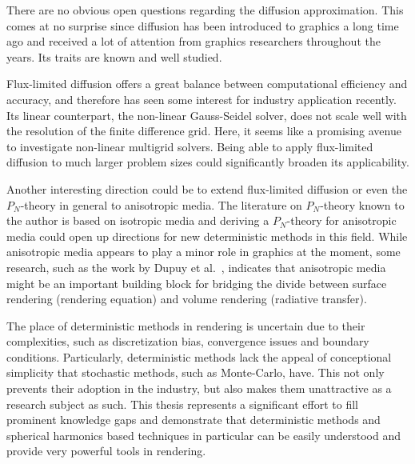 There are no obvious open questions regarding the diffusion approximation. This comes at no surprise since diffusion has been introduced to graphics a long time ago and received a lot of attention from graphics researchers throughout the years. Its traits are known and well studied.

Flux-limited diffusion offers a great balance between computational efficiency and accuracy, and therefore has seen some interest for industry application recently. Its linear counterpart, the non-linear Gauss-Seidel solver, does not scale well with the resolution of the finite difference grid. Here, it seems like a promising avenue to investigate non-linear multigrid solvers. Being able to apply flux-limited diffusion to much larger problem sizes could significantly broaden its applicability.

Another interesting direction could be to extend flux-limited diffusion or even the $P_N$-theory in general to anisotropic media. The literature on $P_N$-theory known to the author is based on isotropic media and deriving a $P_N$-theory for anisotropic media could open up directions for new deterministic methods in this field. While anisotropic media appears to play a minor role in graphics at the moment, some research, such as the work by Dupuy et al.~\cite{Dupuy16}, indicates that anisotropic media might be an important building block for bridging the divide between surface rendering (rendering equation) and volume rendering (radiative transfer).

The place of deterministic methods in rendering is uncertain due to their complexities, such as discretization bias, convergence issues and boundary conditions. Particularly, deterministic methods lack the appeal of conceptional simplicity that stochastic methods, such as Monte-Carlo, have. This not only prevents their adoption in the industry, but also makes them unattractive as a research subject as such. This thesis represents a significant effort to fill prominent knowledge gaps and demonstrate that deterministic methods and spherical harmonics based techniques in particular can be easily understood and provide very powerful tools in rendering.







